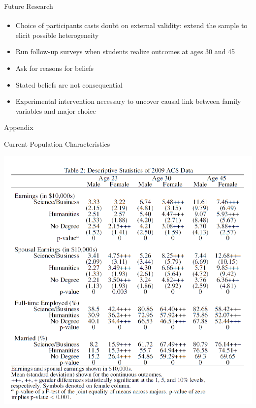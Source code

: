 \documentclass[12pt]{beamer}
\begin{document}
\begin{frame}{Future Research}
    \framesubtitle{} 
    \begin{itemize}
        \item Choice of participants casts doubt on external validity: extend the sample to elicit possible heterogeneity
        \item Run follow-up surveys when students realize outcomes at ages 30 and 45
        \item Ask for reasons for beliefs
        \item Stated beliefs are not consequential
        \item Experimental intervention necessary to uncover causal link between family variables and major choice 
    \end{itemize}
\end{frame}

\begin{frame}
    \begin{center}
        \huge Appendix
    \end{center}
\end{frame}

\begin{frame}{Current Population Characteristics}
    \begin{center}
    \includegraphics[scale=0.4]{Table2.png}
    \end{center}
\end{frame}
\end{document}
